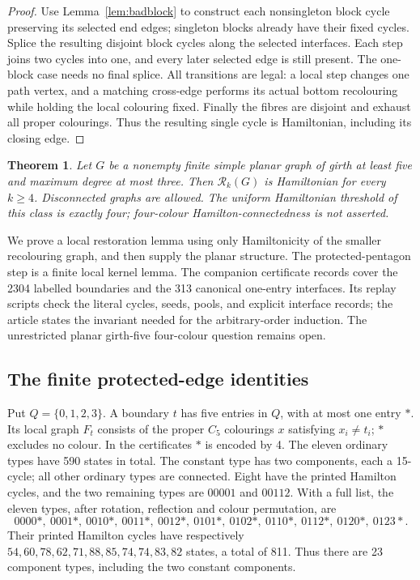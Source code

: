 \documentclass[11pt]{article}
\newtheorem{theorem}{Theorem}[section]
\theoremstyle{remark}
\newcommand{\Rk}{\mathcal R_k}
\numberwithin{equation}{section}
\numberwithin{table}{section}
\begin{document}
\begin{proof}
Use Lemma~\ref{lem:badblock} to construct each nonsingleton block
cycle preserving its selected end edges; singleton blocks already
have their fixed cycles. Splice the resulting disjoint block cycles
along the selected interfaces. Each step joins two cycles into one,
and every later selected edge is still present. The one-block case
needs no final splice. All transitions are legal: a local step changes
one path vertex, and a matching cross-edge performs its actual bottom
recolouring while holding the local colouring fixed. Finally the fibres
are disjoint and exhaust all proper colourings. Thus the resulting
single cycle is Hamiltonian, including its closing edge.
\end{proof}



\begin{theorem}\label{thm:subcubic}
Let $G$ be a nonempty finite simple planar graph of girth at least five
and maximum degree at most three. Then $\Rk(G)$ is Hamiltonian for
every $k\ge4$. Disconnected graphs are allowed. The uniform Hamiltonian threshold
of this class is exactly four; four-colour Hamilton-connectedness is not asserted.
\end{theorem}

We prove a local restoration lemma using only Hamiltonicity of the
smaller recolouring graph, and then supply the planar structure.
The protected-pentagon step is a finite local kernel lemma. The companion
certificate records cover the 2304 labelled boundaries and the 313 canonical
one-entry interfaces. Its replay scripts check the literal cycles, seeds,
pools, and explicit interface records; the article states the invariant
needed for the arbitrary-order induction.
The unrestricted planar girth-five four-colour question remains open.

\subsection{The finite protected-edge identities}
Put $Q=\{0,1,2,3\}$. A boundary $t$ has five entries in $Q$, with at most
one entry $\ast$. Its local graph $F_t$ consists of the proper $C_5$
colourings $x$ satisfying $x_i\ne t_i$; $\ast$ excludes no colour.
In the certificates $\ast$ is encoded by 4.
The eleven ordinary types have 590 states in total.
The constant type has two components, each a 15-cycle; all other
ordinary types are connected. Eight have the printed Hamilton cycles,
and the two remaining types are $00001$ and $00112$.
With a full list, the eleven types, after rotation, reflection and
colour permutation, are
\[
0000\ast,\ 0001\ast,\ 0010\ast,\ 0011\ast,\ 0012\ast,\
0101\ast,\ 0102\ast,\ 0110\ast,\ 0112\ast,\ 0120\ast,\ 0123\ast.
\]
Their printed Hamilton cycles have respectively
$54,60,78,62,71,88,85,74,74,83,82$ states, a total of 811.
Thus there are 23 component types, including the two constant components.
\end{document}
